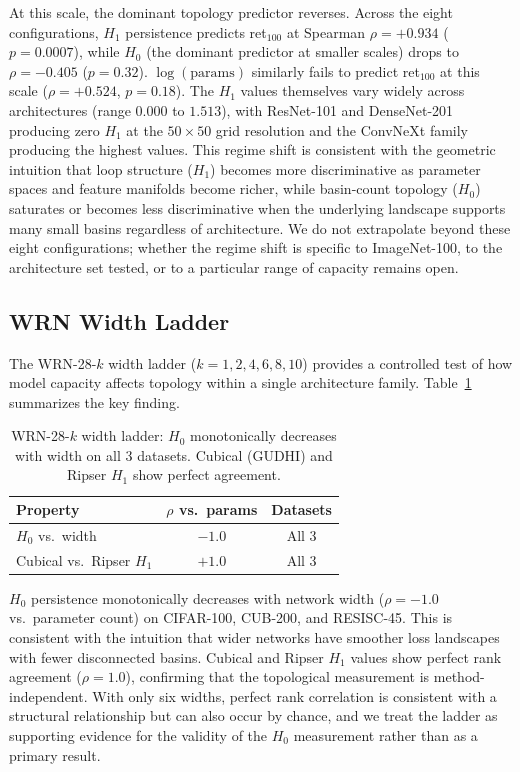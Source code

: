 \documentclass[10pt,twocolumn]{article}
\begin{document}
At this scale, the dominant topology predictor reverses. Across the eight configurations, $H_1$ persistence predicts ret$_{100}$ at Spearman $\rho = +0.934$ ($p = 0.0007$), while $H_0$ (the dominant predictor at smaller scales) drops to $\rho = -0.405$ ($p = 0.32$). $\log(\text{params})$ similarly fails to predict ret$_{100}$ at this scale ($\rho = +0.524$, $p = 0.18$). The $H_1$ values themselves vary widely across architectures (range $0.000$ to $1.513$), with ResNet-101 and DenseNet-201 producing zero $H_1$ at the $50 \times 50$ grid resolution and the ConvNeXt family producing the highest values. This regime shift is consistent with the geometric intuition that loop structure ($H_1$) becomes more discriminative as parameter spaces and feature manifolds become richer, while basin-count topology ($H_0$) saturates or becomes less discriminative when the underlying landscape supports many small basins regardless of architecture. We do not extrapolate beyond these eight configurations; whether the regime shift is specific to ImageNet-100, to the architecture set tested, or to a particular range of capacity remains open.

\subsection{WRN Width Ladder}
\label{sec:wrn}

The WRN-28-$k$ width ladder ($k = 1, 2, 4, 6, 8, 10$) provides a controlled test of how model capacity affects topology within a single architecture family. Table~\ref{tab:wrn} summarizes the key finding.

\begin{table}[t]
\centering
\caption{WRN-28-$k$ width ladder: $H_0$ monotonically decreases with width on all 3 datasets. Cubical (GUDHI) and Ripser $H_1$ show perfect agreement.}
\label{tab:wrn}
\small
\begin{tabular}{@{}lcc@{}}
\toprule
Property & $\rho$ vs.\ params & Datasets \\
\midrule
$H_0$ vs.\ width & $-1.0$ & All 3 \\
Cubical vs.\ Ripser $H_1$ & $+1.0$ & All 3 \\
\bottomrule
\end{tabular}
\end{table}

$H_0$ persistence monotonically decreases with network width ($\rho = -1.0$ vs.\ parameter count) on CIFAR-100, CUB-200, and RESISC-45. This is consistent with the intuition that wider networks have smoother loss landscapes with fewer disconnected basins. Cubical and Ripser $H_1$ values show perfect rank agreement ($\rho = 1.0$), confirming that the topological measurement is method-independent. With only six widths, perfect rank correlation is consistent with a structural relationship but can also occur by chance, and we treat the ladder as supporting evidence for the validity of the $H_0$ measurement rather than as a primary result.
\end{document}
